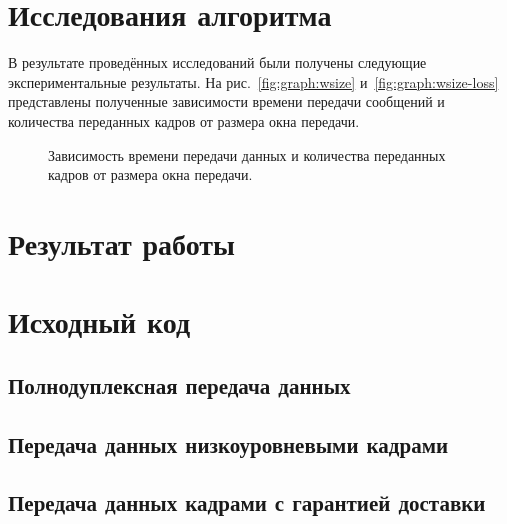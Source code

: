 \documentclass[a4paper,10pt]{article}
\begin{document}
\section{Исследования алгоритма}
В результате проведённых исследований были получены следующие экспериментальные результаты.
На рис.~\ref{fig:graph:wsize} и~\ref{fig:graph:wsize-loss} 
представлены полученные зависимости времени передачи сообщений 
и количества переданных кадров от размера окна передачи.
\begin{figure}
  \centering
  \quad
  \caption{Зависимость времени передачи данных и количества переданных кадров от размера окна передачи.}
  \label{fig:graph:wsize-all}
\end{figure}

\section{Результат работы}

\pagebreak

\appendix
\section{Исходный код}
\label{appendix:sources}


\subsection{Полнодуплексная передача данных}
\label{appendix:sources:duplex-link}

\subsection{Передача данных низкоуровневыми кадрами}
\label{appendix:sources:frame}

\subsection{Передача данных кадрами с гарантией доставки}
\label{appendix:sources:sliding-window}


\pagebreak



\end{document}
